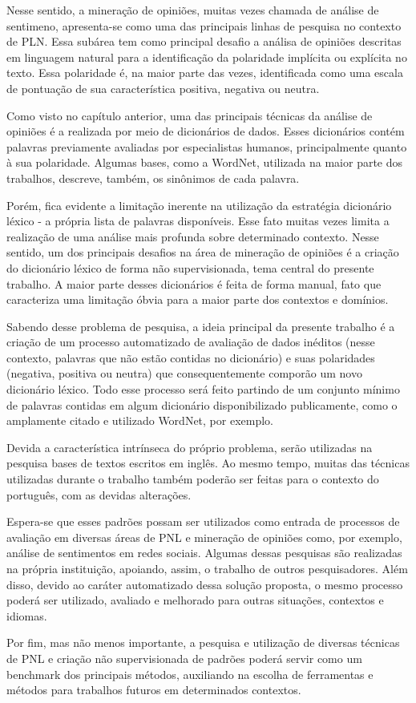 \documentclass[a4paper,11pt]{article}
\begin{document}
Nesse sentido, a mineração de opiniões, muitas vezes chamada de análise de sentimeno, apresenta-se como uma das principais linhas de pesquisa no contexto de PLN. Essa subárea tem como principal desafio a análisa de opiniões descritas em linguagem natural para a identificação da polaridade implícita ou explícita no texto. Essa polaridade é, na maior parte das vezes, identificada como uma escala de pontuação de sua característica positiva, negativa ou neutra.

Como visto no capítulo anterior, uma das principais técnicas da análise de opiniões é a realizada por meio de dicionários de dados. Esses dicionários contém palavras previamente avaliadas por especialistas humanos, principalmente quanto à sua polaridade. Algumas bases, como a WordNet, utilizada na maior parte dos trabalhos, descreve, também, os sinônimos de cada palavra.

Porém, fica evidente a limitação inerente na utilização da estratégia dicionário léxico - a própria lista de palavras disponíveis. Esse fato muitas vezes limita a realização de uma análise mais profunda sobre determinado contexto. Nesse sentido, um dos principais desafios na área de mineração de opiniões é a criação do dicionário léxico de forma não supervisionada, tema central do presente trabalho. A maior parte desses dicionários é feita de forma manual, fato que caracteriza uma limitação óbvia para a maior parte dos contextos e domínios. 

Sabendo desse problema de pesquisa, a ideia principal da presente trabalho é a criação de um processo automatizado de avaliação de dados inéditos (nesse contexto, palavras que não estão contidas no dicionário) e suas polaridades (negativa, positiva ou neutra) que consequentemente comporão um novo dicionário léxico. Todo esse processo será feito partindo de um conjunto mínimo de palavras contidas em algum dicionário disponibilizado publicamente, como o amplamente citado e utilizado WordNet, por exemplo.

Devida a característica intrínseca do próprio problema, serão utilizadas na pesquisa bases de textos escritos em inglês. Ao mesmo tempo, muitas das técnicas utilizadas durante o trabalho também poderão ser feitas para o contexto do português, com as devidas alterações. 

Espera-se que esses padrões possam ser utilizados como entrada de processos de avaliação em diversas áreas de PNL e mineração de opiniões como, por exemplo, análise de sentimentos em redes sociais. Algumas dessas pesquisas são realizadas na própria instituição, apoiando, assim, o trabalho de outros pesquisadores. Além disso, devido ao caráter automatizado dessa solução proposta, o mesmo processo poderá ser utilizado, avaliado e melhorado para outras situações, contextos e idiomas.

Por fim, mas não menos importante, a pesquisa e utilização de diversas técnicas de PNL e criação não supervisionada de padrões poderá servir como um benchmark dos principais métodos, auxiliando na escolha de ferramentas e métodos para trabalhos futuros em determinados contextos.




\end{document}
